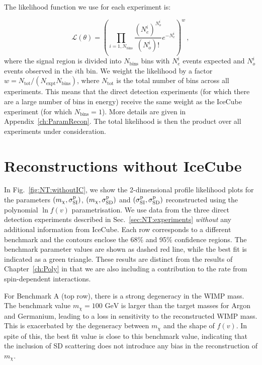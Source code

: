 The likelihood function we use for each experiment is:

\begin{equation}
\mathcal{L}(\theta) = \left(\prod_{i = 1, N_\textrm{bins}} \frac{(N_e^i)^{N_o^i}}{(N_o^i)!}e^{-N_e^i}\right)^{w}\,,
\end{equation}
where the signal region is divided into $N_\textrm{bins}$ bins with $N_e^i$ events expected and $N_o^i$ events observed in the $i$th bin. We weight the likelihood by a factor $w = N_\textrm{tot}/(N_\textrm{expt}N_\textrm{bins})$, where $N_\textrm{tot}$ is the total number of bins across all experiments. This means that the direct detection experiments (for which there are a large number of bins in energy) receive the same weight as the IceCube experiment (for which $N_\textrm{bins} = 1$). More details are given in Appendix~\ref{ch:ParamRecon}. The total likelihood is then the product over all experiments under consideration.

\section{Reconstructions without IceCube}
\label{sec:NT:withoutIC}

In Fig.~\ref{fig:NT:withoutIC}, we show the 2-dimensional profile likelihood plots for the parameters $(m_\chi, \sigmapsi)$, $(m_\chi, \sigmapsd)$ and $(\sigmapsi, \sigmapsd)$ reconstructed using the polynomial $\ln f(v)$ parametrisation. We use data from the three direct detection experiments described in Sec.~\ref{sec:NT:experiments} \textit{without} any additional information from IceCube. Each row corresponds to a different benchmark and the contours enclose the 68\% and 95\% confidence regions. The benchmark parameter values are shown as dashed red line, while the best fit is indicated as a green triangle. These results are distinct from the results of Chapter~\ref{ch:Poly} in that we are also including a contribution to the rate from spin-dependent interactions.

For Benchmark A (top row), there is a strong degeneracy in the WIMP mass. The benchmark value $m_\chi = 100 \textrm{ GeV}$ is larger than the target masses for Argon and Germanium, leading to a loss in sensitivity to the reconstructed WIMP mass. This is exacerbated by the degeneracy between $m_\chi$ and the shape of $f(v)$.  In spite of this, the best fit value is close to this benchmark value, indicating that the inclusion of SD scattering does not introduce any bias in the reconstruction of $m_\chi$. 

